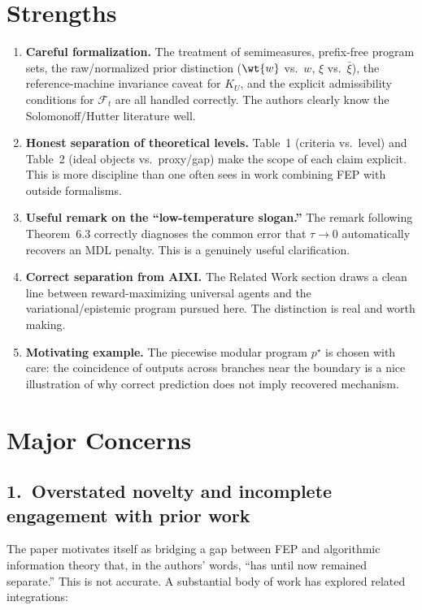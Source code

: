 \documentclass[11pt]{article}
\begin{document}
\section*{Strengths}

\begin{enumerate}[leftmargin=*]
\item \textbf{Careful formalization.} The treatment of semimeasures, prefix-free program sets, the raw/normalized prior distinction ($\wt{w}$ vs.\ $w$, $\xi$ vs.\ $\bar\xi$), the reference-machine invariance caveat for $K_U$, and the explicit admissibility conditions for $\mathcal{F}_t$ are all handled correctly. The authors clearly know the Solomonoff/Hutter literature well.
\item \textbf{Honest separation of theoretical levels.} Table~1 (criteria vs.\ level) and Table~2 (ideal objects vs.\ proxy/gap) make the scope of each claim explicit. This is more discipline than one often sees in work combining FEP with outside formalisms.
\item \textbf{Useful remark on the ``low-temperature slogan.''} The remark following Theorem~6.3 correctly diagnoses the common error that $\tau\to 0$ automatically recovers an MDL penalty. This is a genuinely useful clarification.
\item \textbf{Correct separation from AIXI.} The Related Work section draws a clean line between reward-maximizing universal agents and the variational/epistemic program pursued here. The distinction is real and worth making.
\item \textbf{Motivating example.} The piecewise modular program $p^\star$ is chosen with care: the coincidence of outputs across branches near the boundary is a nice illustration of why correct prediction does not imply recovered mechanism.
\end{enumerate}

\section*{Major Concerns}

\subsection*{1.\ Overstated novelty and incomplete engagement with prior work}

The paper motivates itself as bridging a gap between FEP and algorithmic information theory that, in the authors' words, ``has until now remained separate.'' This is not accurate. A substantial body of work has explored related integrations:
\end{document}
